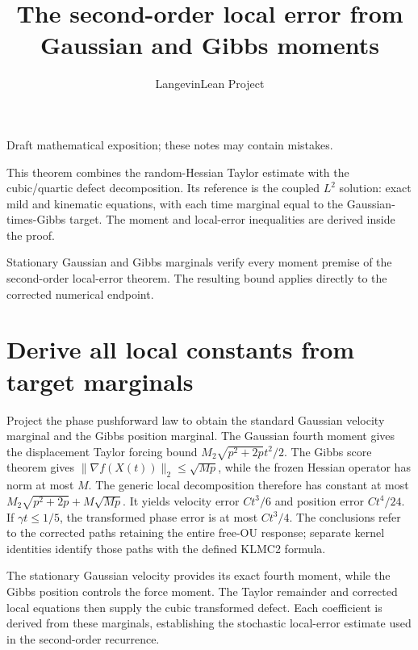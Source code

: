 \documentclass[11pt,a4paper]{article}
\title{\texorpdfstring{The second-order local error from Gaussian and Gibbs moments}{The second-order local error from Gaussian and Gibbs moments}}
\author{LangevinLean Project}
\date{}
\begin{document}
\maketitle
Draft mathematical exposition; these notes may contain mistakes.


This theorem combines the random-Hessian Taylor estimate with the cubic/\allowbreak{}quartic defect decomposition. Its reference is the coupled \(L^{2}\) solution: exact mild and kinematic equations, with each time marginal equal to the Gaussian-times-Gibbs target. The moment and local-error inequalities are derived inside the proof.



Stationary Gaussian and Gibbs marginals verify every moment premise of the second-order local-error theorem. The resulting bound applies directly to the corrected numerical endpoint.


\section{\texorpdfstring{Derive all local constants from target marginals}{Derive all local constants from target marginals}}


Project the phase pushforward law to obtain the standard Gaussian velocity marginal and the Gibbs position marginal. The Gaussian fourth moment gives the displacement Taylor forcing bound \(M_{2}\sqrt{p^{2}+2p}t^{2}/2\). The Gibbs score theorem gives \(\|\nabla f(X(t))\|_{2}\le \sqrt{Mp}\), while the frozen Hessian operator has norm at most \(M\). The generic local decomposition therefore has constant at most \(M_{2}\sqrt{p^{2}+2p}+M\sqrt{Mp}\). It yields velocity error \(Ct^{3}/6\) and position error \(Ct^{4}/24\). If \(\gamma t\le 1/5\), the transformed phase error is at most \(Ct^{3}/4\). The conclusions refer to the corrected paths retaining the entire free-OU response; separate kernel identities identify those paths with the defined KLMC2 formula.



The stationary Gaussian velocity provides its exact fourth moment, while the Gibbs position controls the force moment. The Taylor remainder and corrected local equations then supply the cubic transformed defect. Each coefficient is derived from these marginals, establishing the stochastic local-error estimate used in the second-order recurrence.
\end{document}
